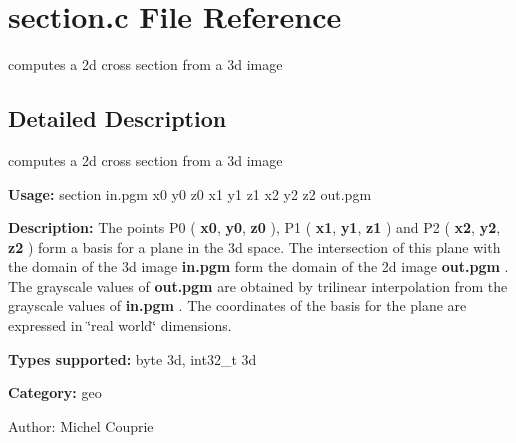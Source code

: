 \section{section.c File Reference}
\label{section_8c}
computes a 2d cross section from a 3d image  




\label{_details}
\subsection{Detailed Description}
computes a 2d cross section from a 3d image 

{\bf Usage:} section in.pgm x0 y0 z0 x1 y1 z1 x2 y2 z2 out.pgm

{\bf Description:} The points P0 ( {\bf x0}, {\bf y0}, {\bf z0} ), P1 ( {\bf x1}, {\bf y1}, {\bf z1} ) and P2 ( {\bf x2}, {\bf y2}, {\bf z2} ) form a basis for a plane in the 3d space. The intersection of this plane with the domain of the 3d image {\bf in.pgm} form the domain of the 2d image {\bf out.pgm} . The grayscale values of {\bf out.pgm} are obtained by trilinear interpolation from the grayscale values of {\bf in.pgm} . The coordinates of the basis for the plane are expressed in \char`\"{}real world\char`\"{} dimensions.

{\bf Types supported:} byte 3d, int32\_\-t 3d

{\bf Category:} geo

\begin{Desc}
\item[Author:]Michel Couprie \end{Desc}
